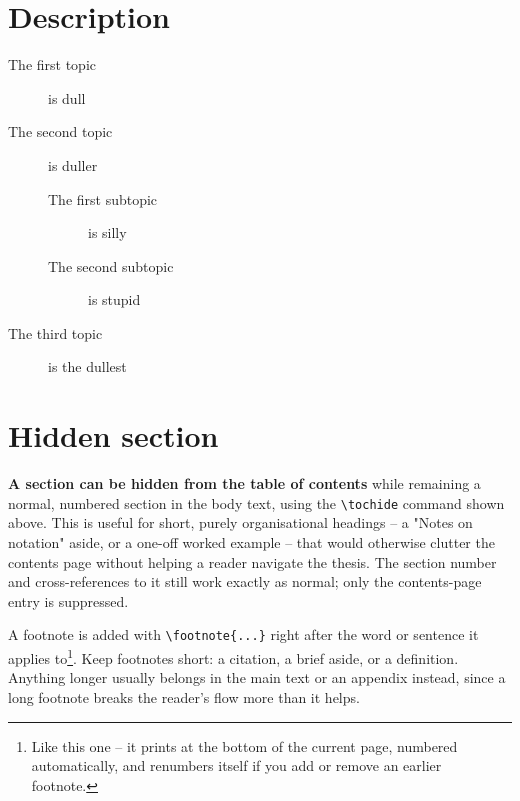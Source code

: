 \section*{Description}
\begin{description}
\item[The first topic] is dull
\item[The second topic] is duller
\begin{description}
\item[The first subtopic] is silly
\item[The second subtopic] is stupid
\end{description}
\item[The third topic] is the dullest
\end{description}


\clearpage

\tochide\section{Hidden section}
\textbf{A section can be hidden from the table of contents} while
remaining a normal, numbered section in the body text, using the
\texttt{\textbackslash tochide} command shown above. This is useful for
short, purely organisational headings -- a "Notes on notation" aside, or
a one-off worked example -- that would otherwise clutter the contents
page without helping a reader navigate the thesis. The section number
and cross-references to it still work exactly as normal; only the
contents-page entry is suppressed.

A footnote is added with \texttt{\textbackslash footnote\{...\}} right
after the word or sentence it applies to\footnote{Like this one -- it
prints at the bottom of the current page, numbered automatically, and
renumbers itself if you add or remove an earlier footnote.}. Keep
footnotes short: a citation, a brief aside, or a definition. Anything
longer usually belongs in the main text or an appendix instead, since a
long footnote breaks the reader's flow more than it helps.


